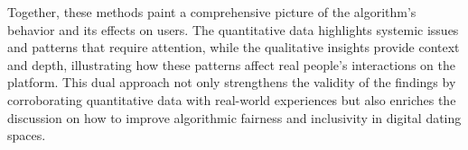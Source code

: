 Together, these methods paint a comprehensive picture of the algorithm's behavior and its effects on users. The quantitative data highlights systemic issues and patterns that require attention, while the qualitative insights provide context and depth, illustrating how these patterns affect real people's interactions on the platform. This dual approach not only strengthens the validity of the findings by corroborating quantitative data with real-world experiences but also enriches the discussion on how to improve algorithmic fairness and inclusivity in digital dating spaces.

\section{}